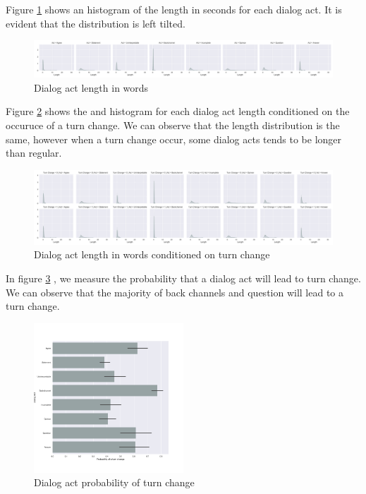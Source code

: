 Figure \ref{dactssecsbyname} shows an histogram of the length in seconds for each dialog act. It is evident that the distribution is left tilted.

 \begin{figure}[ht!]
 \centering
 \includegraphics[width=\textwidth]{../scikitlearn/figures/grid_secs_by_da_name.pdf}
 \caption{Dialog act length in words \label{overflow}}
 \label{dactssecsbyname}
  \end{figure}
 
 Figure \ref{l3} shows the and histogram for each dialog act length conditioned on the occuruce of a turn change. We can observe that the length distribution is the same, however when a turn change occur, some
 dialog acts tends to be longer than regular. 
 
\begin{figure}[ht!]
 \centering
 \includegraphics[width=\textwidth]{../scikitlearn/figures/grid_secs_by_da_name_by_tchange.pdf}
 \caption{Dialog act length in words conditioned on turn change\label{overflow}}
 \label{l3}
 \end{figure}
 
In figure \ref{l4} , we measure the probability that a dialog act will lead to turn change. We can observe that the majority of back channels and question will lead to a turn change.  

\begin{figure}[ht!]
\centering
\includegraphics[width=0.5\textwidth]{../scikitlearn/figures/barplot_da_prob_to_tchange.png}
\caption{Dialog act probability of turn change\label{overflow}}
\label{l4}
\end{figure}


